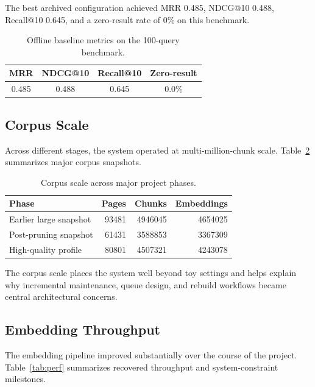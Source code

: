 \documentclass[conference]{IEEEtran}
\begin{document}
The best archived configuration achieved MRR 0.485, NDCG@10 0.488, Recall@10 0.645, and a zero-result rate of 0\% on this benchmark.

\begin{table}[t]
\caption{Offline baseline metrics on the 100-query benchmark.}
\label{tab:offline-metrics}
\centering
\small
\setlength{\tabcolsep}{4pt}
\begin{tabular}{cccc}
\toprule
\textbf{MRR} & \textbf{NDCG@10} & \textbf{Recall@10} & \textbf{Zero-result} \\
\midrule
0.485 & 0.488 & 0.645 & 0.0\% \\
\bottomrule
\end{tabular}
\end{table}

\subsection{Corpus Scale}
Across different stages, the system operated at multi-million-chunk scale. Table~\ref{tab:corpora} summarizes major corpus snapshots.

\begin{table}[t]
\caption{Corpus scale across major project phases.}
\label{tab:corpora}
\centering
\small
\setlength{\tabcolsep}{4pt}
\begin{tabular}{lrrr}
\toprule
\textbf{Phase} & \textbf{Pages} & \textbf{Chunks} & \textbf{Embeddings} \\
\midrule
Earlier large snapshot & \num{93481} & \num{4946045} & \num{4654025} \\
Post-pruning snapshot & \num{61431} & \num{3588853} & \num{3367309} \\
High-quality profile & \num{80801} & \num{4507321} & \num{4243078} \\
\bottomrule
\end{tabular}
\end{table}

The corpus scale places the system well beyond toy settings and helps explain why incremental maintenance, queue design, and rebuild workflows became central architectural concerns.

\subsection{Embedding Throughput}
The embedding pipeline improved substantially over the course of the project. Table~\ref{tab:perf} summarizes recovered throughput and system-constraint milestones.
\end{document}
